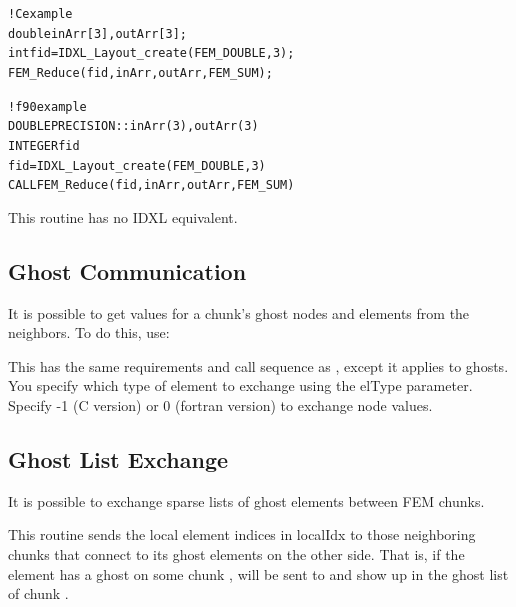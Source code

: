 \documentclass[10pt]{article}
\begin{document}
\begin{alltt}
! C example
   double inArr[3], outArr[3];
   int fid=IDXL_Layout_create(FEM_DOUBLE,3);
   FEM_Reduce(fid,inArr,outArr,FEM_SUM);

! f90 example
   DOUBLE PRECISION :: inArr(3), outArr(3)
   INTEGER fid
   fid=IDXL_Layout_create(FEM_DOUBLE,3)
   CALL FEM_Reduce(fid,inArr,outArr,FEM_SUM)
\end{alltt}

     This routine has no IDXL equivalent.


\subsection{Ghost Communication}

It is possible to get values for a chunk's ghost nodes and elements from the neighbors. To do this, use:


This has the same requirements and call sequence as , except it applies to ghosts. You specify which type of element to exchange using the elType parameter. Specify -1 (C version) or 0 (fortran version) to exchange node values.  


\subsection{Ghost List Exchange}

It is possible to exchange sparse lists of ghost elements between FEM chunks.


This routine sends the local element indices in localIdx to those neighboring chunks that connect to its ghost elements on the other side.  That is, if the element
 has a ghost on some chunk ,  will be sent to 
and show up in the ghost list of chunk .
\end{document}
